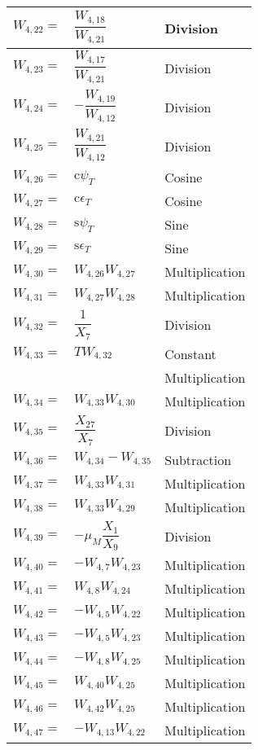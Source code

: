 \begin{longtable}{|p{1.5cm}|l|p{2cm}|}
$W_{4,22}=$ & $ \dfrac{W_{4,18}}{W_{4,21}} $ & Division \\ \hline
$W_{4,23}=$ & $ \dfrac{W_{4,17}}{W_{4,21}} $ & Division \\ \hline
$W_{4,24}=$ & $ -\dfrac{W_{4,19}}{W_{4,12}} $ & Division \\ \hline
$W_{4,25}=$ & $ \dfrac{W_{4,21}}{W_{4,12}} $ & Division \\ \hline
$W_{4,26}=$ & $ \text{c}\psi_{T} $ & Cosine \\ \hline
$W_{4,27}=$ & $ \text{c}\epsilon_{T} $ & Cosine \\ \hline
$W_{4,28}=$ & $ \text{s}\psi_{T} $ & Sine \\ \hline
$W_{4,29}=$ & $ \text{s}\epsilon_{T} $ & Sine \\ \hline
$W_{4,30}=$ & $ W_{4,26}W_{4,27} $ & Multiplication \\ \hline
$W_{4,31}=$ & $ W_{4,27}W_{4,28} $ & Multiplication \\ \hline
$W_{4,32}=$ & $ \dfrac{1}{X_{7}} $ & Division \\ \hline
$W_{4,33}=$ & $ T W_{4,32} $ & Constant  \\ 
& & Multiplication \\ \hline
$W_{4,34}=$ & $ W_{4,33}W_{4,30} $ & Multiplication \\ \hline
$W_{4,35}=$ & $ \dfrac{X_{27}}{X_{7}} $ & Division \\ \hline
$W_{4,36}=$ & $ W_{4,34}-W_{4,35} $ & Subtraction \\ \hline
$W_{4,37}=$ & $ W_{4,33}W_{4,31} $ & Multiplication \\ \hline
$W_{4,38}=$ & $ W_{4,33}W_{4,29} $ & Multiplication \\ \hline
$W_{4,39}=$ & $ -\mu_{M}\dfrac{X_{1}}{X_{9}} $ & Division \\ \hline
$W_{4,40}=$ & $ -W_{4,7}W_{4,23} $ & Multiplication \\ \hline
$W_{4,41}=$ & $ W_{4,8}W_{4,24} $ & Multiplication \\ \hline
$W_{4,42}=$ & $ -W_{4,5}W_{4,22} $ & Multiplication \\ \hline
$W_{4,43}=$ & $ -W_{4,5}W_{4,23} $ & Multiplication \\ \hline
$W_{4,44}=$ & $ -W_{4,8}W_{4,25} $ & Multiplication \\ \hline
$W_{4,45}=$ & $ W_{4,40}W_{4,25} $ & Multiplication \\ \hline
$W_{4,46}=$ & $ W_{4,42}W_{4,25} $ & Multiplication \\ \hline
$W_{4,47}=$ & $ -W_{4,13}W_{4,22} $ & Multiplication \\ \hline

\end{longtable}
